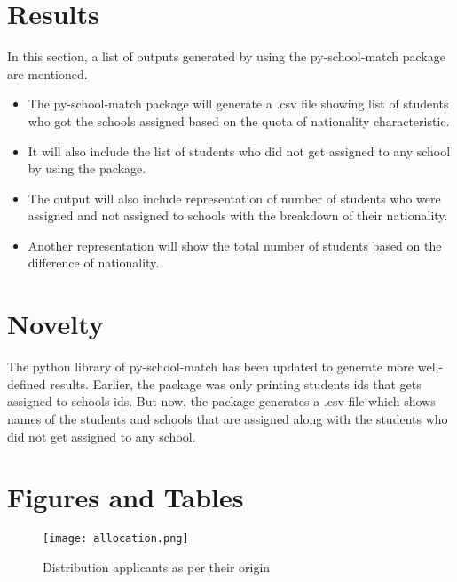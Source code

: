 \documentclass[twocolumn]{bmcart}
\begin{document}
		
		\section*{Results}
		\vspace{\baselineskip}
		In this section, a list of outputs generated by using the py-school-match package are mentioned.\vspace{\baselineskip}
		
		\begin{itemize}
			\vspace{-0.4cm}\item The py-school-match package will generate a .csv file showing list of students who got the schools assigned based on the quota of nationality characteristic. \vspace{\baselineskip}
			\vspace{-0.4cm}\item It will also include the list of students who did not get assigned to any school by using the package. \vspace{\baselineskip}
			\vspace{-0.4cm}\item The output will also include representation of number of students who were assigned and not assigned to schools with the breakdown of their nationality. \vspace{\baselineskip}
			\vspace{-0.4cm}\item Another representation will show the total number of students based on the difference of nationality. \vspace{\baselineskip}
		\end{itemize}
		
		\section*{Novelty}
		
		The python library of py-school-match has been updated to generate more well-defined results. Earlier, the package was only printing students ids that gets assigned to schools ids. But now, the package generates a .csv file which shows names of the students and schools that are assigned along with the students who did not get assigned to any school.
		
		\section*{Figures and Tables}
		\begin{figure}[h!]
			\centering
			\texttt{[image: allocation.png]}
			\caption{Distribution applicants as per their origin}
			\label{fig:Distribution}
		\end{figure}
		
\end{document}
